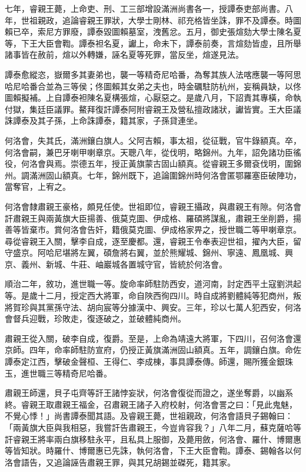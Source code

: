 \begin{pinyinscope}
七年，睿親王薨，上命吏、刑、工三部增設滿洲尚書各一，授譚泰吏部尚書。八年，世祖親政，追論睿親王罪狀，大學士剛林、祁充格皆坐誅，罪不及譚泰。時圖賴已卒，索尼方罪廢，譚泰毀圖賴墓室，洩舊忿。五月，御史張煊劾大學士陳名夏等，下王大臣會鞫。譚泰袒名夏，讞上，命未下，譚泰前奏，言煊劾皆虛，且所舉諸事皆在赦前，煊以外轉嫌，誣名夏等死罪，當反坐，煊遂見法。

譚泰愈縱恣，嶽爾多其妻弟也，襲一等精奇尼哈番，為奪其族人法喀應襲一等阿思哈尼哈番合並為三等侯；佟圖賴其女弟之夫也，時金礪駐防杭州，妄稱員缺，以佟圖賴擬補。上自譚泰袒陳名夏構張煊，心厭惡之。是歲八月，下詔責其專橫，命執付獄，集廷臣議罪。鰲拜復訐譚泰阿附睿親王及營私擅政諸狀，讞皆實。王大臣議誅譚泰及其子孫，上命誅譚泰，籍其家，子孫貸連坐。

何洛會，失其氏，滿洲鑲白旗人。父阿吉賴，事太祖，從征戰，官牛錄額真。卒，何洛會嗣，兼巴牙喇甲喇章京。天聰八年，從伐明，略錦州。九年，詔免諸功臣徭役，何洛會與焉。崇德五年，授正黃旗蒙古固山額真。從睿親王多爾袞伐明，圍錦州。調滿洲固山額真。七年，錦州既下，追論圍錦州時何洛會匿鄂羅塞臣破陣功，當奪官，上宥之。

何洛會隸肅親王豪格，頗見任使。世祖即位，睿親王攝政，與肅親王有隙。何洛會訐肅親王與兩黃旗大臣揚善、俄莫克圖、伊成格、羅碩將謀亂，肅親王坐削爵，揚善等皆棄市。賞何洛會告奸，籍俄莫克圖、伊成格家畀之，授世職二等甲喇章京。尋從睿親王入關，擊李自成，逐至慶都。還，睿親王令奉表迎世祖，擢內大臣，留守盛京。阿哈尼堪將左翼，碩詹將右翼，並於熊耀城、錦州、寧遠、鳳凰城、興京、義州、新城、牛莊、岫巖城各置城守官，皆統於何洛會。

順治二年，敘功，進世職一等。旋命率師駐防西安，道河南，討定西平土寇劉洪起等。是歲十二月，授定西大將軍，命自陜西徇四川。時自成將劉體純等犯商州，叛將賀珍與其黨孫守法、胡向宸等分據漢中、興安。三年，珍以七萬人犯西安，何洛會督兵迎戰，珍敗走，復逐破之，並破體純商州。

肅親王從入關，破李自成，復爵。至是，上命為靖遠大將軍，下四川，召何洛會還京師。四年，命率師駐防宣府，仍授正黃旗滿洲固山額真。五年，調鑲白旗。命佐譚泰定江西，擊破金聲桓、王得仁、李成棟，事具譚泰傳。師還，賜所獲金銀珠玉，進世職三等精奇尼哈番。

肅親王師還，貝子屯齊等訐王諸悖妄狀，何洛會復從而證之，遂坐奪爵，以幽系終。睿親王取肅親王福金，召肅親王諸子入府校射，何洛會詈之曰：「見此鬼魅，不覺心悸！」尚書譚泰聞其語。及睿親王薨，世祖親政，何洛會語貝子錫翰曰：「兩黃旗大臣與我相惡，我嘗訐告肅親王，今豈肯容我？」八年二月，蘇克薩哈等訐睿親王將率兩白旗移駐永平，且私具上服御，及薨用斂，何洛會、羅什、博爾惠等皆知狀。時羅什、博爾惠已先誅，執何洛會，下王大臣會鞫。譚泰、錫翰各以何洛會語告，又追論誣告肅親王罪，與其兄胡錫並磔死，籍其家。


\end{pinyinscope}
